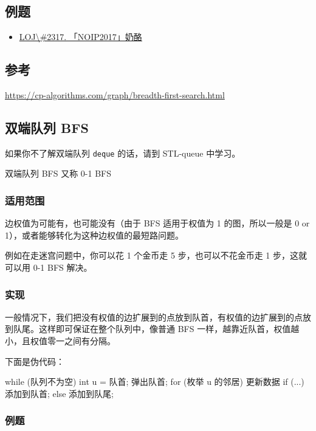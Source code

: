 \subsection{例题}

\begin{itemize}
\item \href{https://loj.ac/problem/2317}{LOJ\textbackslash{}\#2317. 「NOIP2017」奶酪}
\end{itemize}

\subsection{参考}

\url{https://cp-algorithms.com/graph/breadth-first-search.html}

\subsection{双端队列 BFS}

如果你不了解双端队列 \texttt{deque} 的话，请到 STL-queue 中学习。

双端队列 BFS 又称 0-1 BFS

\subsubsection{适用范围}

边权值为可能有，也可能没有（由于 BFS 适用于权值为 1 的图，所以一般是 0 or 1），或者能够转化为这种边权值的最短路问题。

例如在走迷宫问题中，你可以花 1 个金币走 5 步，也可以不花金币走 1 步，这就可以用 0-1 BFS 解决。

\subsubsection{实现}

一般情况下，我们把没有权值的边扩展到的点放到队首，有权值的边扩展到的点放到队尾。这样即可保证在整个队列中，像普通 BFS 一样，越靠近队首，权值越小，且权值零一之间有分隔。

下面是伪代码：

\begin{cppcode}
while (队列不为空) {
  int u = 队首;
  弹出队首;
  for (枚举 u 的邻居) {
    更新数据
    if (...)
      添加到队首;
    else
      添加到队尾;
  }
}
\end{cppcode}

\subsubsection{例题}


